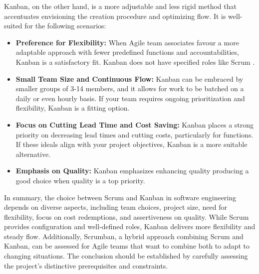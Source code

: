 \documentclass[conference]{IEEEtran}
\begin{document}
Kanban, on the other hand, is a more adjustable and less rigid method that accentuates envisioning the creation procedure and optimizing flow. It is well-suited for the following scenarios:

\begin{itemize}
\item \textbf{Preference for Flexibility:} When Agile team associates favour a more adaptable approach with fewer predefined functions and accountabilities, Kanban is a satisfactory fit. Kanban does not have specified roles like Scrum \cite{s1-alqudah2018empirical}\cite{kniberg2010kanban}.

\item \textbf{Small Team Size and Continuous Flow:} Kanban can be embraced by smaller groups of 3-14 members, and it allows for work to be batched on a daily or even hourly basis. If your team requires ongoing prioritization and flexibility, Kanban is a fitting option\cite{s1-alqudah2018empirical}\cite{kniberg2010kanban}.

\item \textbf{Focus on Cutting Lead Time and Cost Saving:} Kanban places a strong priority on decreasing lead times and cutting costs, particularly for functions. If these ideals align with your project objectives, Kanban is a more suitable alternative\cite{s1-alqudah2018empirical}.

\item \textbf{Emphasis on Quality:}  Kanban emphasizes enhancing quality producing a good choice when quality is a top priority\cite{s1-alqudah2018empirical}.
\end{itemize}

In summary, the choice between Scrum and Kanban in software engineering depends on diverse aspects, including team choices, project size, need for flexibility, focus on cost redemptions, and assertiveness on quality. While Scrum provides configuration and well-defined roles, Kanban delivers more flexibility and steady flow. Additionally, Scrumban, a hybrid approach combining Scrum and Kanban, can be assessed for Agile teams that want to combine both to adapt to changing situations. The conclusion should be established by carefully assessing the project's distinctive prerequisites and constraints.\cite{abrahamsson2017agile}
\end{document}
